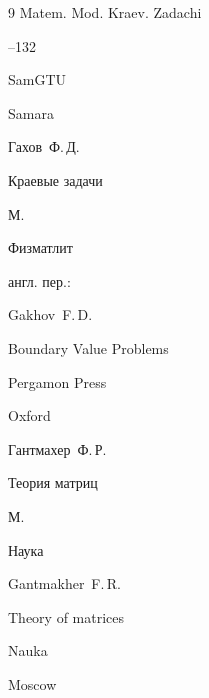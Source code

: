 \begin{thebibliography}{9}
\serial Matem. Mod. Kraev. Zadachi


--132

\publ SamGTU

\publaddr Samara




\by Гахов~Ф.\,Д.

\book Краевые задачи

\publaddr М.

\publ Физматлит



\transl англ. пер.:

Gakhov~F.\,D.

\book Boundary Value Problems

\publ Pergamon Press

\publaddr Oxford 








\by Гантмахер~Ф.\,Р.

\book Теория матриц

\publaddr М.

\publ Наука



\misctransl

\by Gantmakher~F.\,R. 

\book Theory of matrices

\publ Nauka

\publaddr Moscow









\end{thebibliography}



\hskip6.5cm \thedate \par

\hskip6.5cm\therevdate\par





\makeengtitlem







\newpage






%


